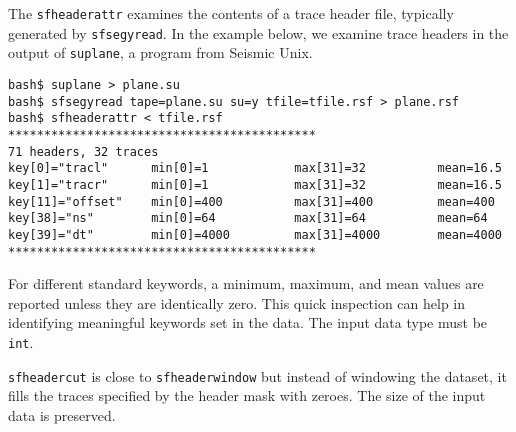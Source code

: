 The \texttt{sfheaderattr} examines the contents of a trace header file,
typically generated by \texttt{sfsegyread}. In the example below, we examine
trace headers in the output of \texttt{suplane}, a program from Seismic Unix.
\begin{verbatim}
bash$ suplane > plane.su
bash$ sfsegyread tape=plane.su su=y tfile=tfile.rsf > plane.rsf
bash$ sfheaderattr < tfile.rsf
*******************************************
71 headers, 32 traces
key[0]="tracl"      min[0]=1            max[31]=32          mean=16.5
key[1]="tracr"      min[0]=1            max[31]=32          mean=16.5
key[11]="offset"    min[0]=400          max[31]=400         mean=400
key[38]="ns"        min[0]=64           max[31]=64          mean=64
key[39]="dt"        min[0]=4000         max[31]=4000        mean=4000
*******************************************
\end{verbatim}
For different standard keywords, a minimum, maximum, and mean values
are reported unless they are identically zero.  This quick inspection
can help in identifying meaningful keywords set in the data. The input
data type must be \texttt{int}.


\noindent\doublebox{\parbox{\textwidth}{
    
  }}

\texttt{sfheadercut} is close to \texttt{sfheaderwindow} but instead
of windowing the dataset, it fills the traces specified by the header
mask with zeroes. The size of the input data is preserved.


